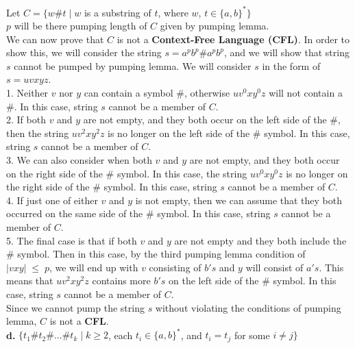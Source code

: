 \documentclass[12pt]{article}
\begin{document}
Let $C = \{ w \# t \; | \; w$ is a substring of $t$, where $w$, $t \in \{a, b\}^* \}$ \\
$p$ will be there pumping length of $C$ given by pumping lemma. \\

We can now prove that $C$ is not a \textbf{Context-Free Language (CFL)}.
In order to show this, we will consider the string $s = a^p b^p \# a^p b^p $,
and we will show that string $s$ cannot be pumped by pumping lemma. We will
consider $s$ in the form of $s = uvxyz$. \\

1. Neither $v$ nor $y$ can contain a symbol $\#$, otherwise $u v^0 x y^0 z$
will not contain a $\#$. In this case, string $s$ cannot be a member of $C$. \\

2. If both $v$ and $y$ are not empty, and they both occur on the left side of the
$\#$, then the string $u v^2 x y^2 z$ is no longer on the left side of the
$\#$ symbol. In this case, string $s$ cannot be a member of $C$. \\

3. We can also consider when both $v$ and $y$ are not empty, and they both occur
on the right side of the $\#$ symbol. In this case, the string $u v^0 x y^0 z$
is no longer on the right side of the $\#$ symbol. In this case, string $s$ 
cannot be a member of $C$. \\

4. If just one of either $v$ and $y$ is not empty, then we can assume that they
both occurred on the same side of the $\#$ symbol. In this case, string $s$ 
cannot be a member of $C$. \\

5. The final case is that if both $v$ and $y$ are not empty and they both
include the $\#$ symbol. Then in this case, by the third pumping lemma
condition of $|vxy| \; \le \; p$, we will end up with $v$ consisting of
$b's$ and $y$ will consist of $a's$. This means that $u v^2 x y^2 z$ contains
more $b's$ on the left side of the $\#$ symbol. In this case, string $s$ 
cannot be a member of $C$. \\

Since we cannot pump the string $s$ without violating the conditions of
pumping lemma, $C$ is not a \textbf{CFL}. \\


\textbf{d.} $\{t_1 \# t_2 \# ... \# t_k \; | \; k \geq 2$, each $t_i \in \{a, b\}^*$, and $t_i = t_j$ for some $i \ne j \} $ \\
\end{document}
